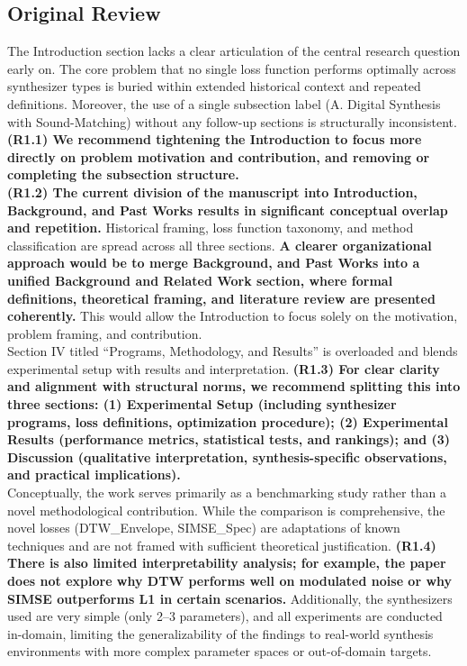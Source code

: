 \documentclass[11pt]{article}
\begin{document}
\subsection{Original Review}
\noindent
The Introduction section lacks a clear articulation of the central research question early on. The core problem that no single loss function performs optimally across synthesizer types is buried within extended historical context and repeated definitions. Moreover, the use of a single subsection label (A. Digital Synthesis with Sound-Matching) without any follow-up sections is structurally inconsistent. \textbf{(R1.1) We recommend tightening the Introduction to focus more directly on problem motivation and contribution, and removing or completing the subsection structure.} \\
\textbf{(R1.2) The current division of the manuscript into Introduction, Background, and Past Works results in significant conceptual overlap and repetition.} Historical framing, loss function taxonomy, and method classification are spread across all three sections. \textbf{A clearer organizational approach would be to merge Background, and Past Works into a unified Background and Related Work section, where formal definitions, theoretical framing, and literature review are presented coherently.} This would allow the Introduction to focus solely on the motivation, problem framing, and contribution. \\
Section IV titled ``Programs, Methodology, and Results'' is overloaded and blends experimental setup with results and interpretation. \textbf{(R1.3) For clear clarity and alignment with structural norms, we recommend splitting this into three sections: (1) Experimental Setup (including synthesizer programs, loss definitions, optimization procedure); (2) Experimental Results (performance metrics, statistical tests, and rankings); and (3) Discussion (qualitative interpretation, synthesis-specific observations, and practical implications).} \\
Conceptually, the work serves primarily as a benchmarking study rather than a novel methodological contribution. While the comparison is comprehensive, the novel losses (DTW\_Envelope, SIMSE\_Spec) are adaptations of known techniques and are not framed with sufficient theoretical justification. \textbf{(R1.4) There is also limited interpretability analysis; for example, the paper does not explore why DTW performs well on modulated noise or why SIMSE outperforms L1 in certain scenarios.} Additionally, the synthesizers used are very simple (only 2--3 parameters), and all experiments are conducted in-domain, limiting the generalizability of the findings to real-world synthesis environments with more complex parameter spaces or out-of-domain targets. \\
\end{document}
